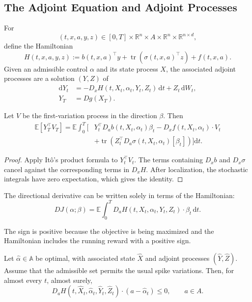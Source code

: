 \subsection{The Adjoint Equation and Adjoint Processes}

\begin{de}
For
\[
(t,x,a,y,z)
\in[0,T]\times\mathbb R^n\times A
\times\mathbb R^n\times\mathbb R^{n\times d},
\]
define the Hamiltonian
\[
H(t,x,a,y,z)
:=b(t,x,a)^\top y
+\operatorname{tr}\!\left(\sigma(t,x,a)^\top z\right)
+f(t,x,a).
\]
Given an admissible control \(\alpha\) and its state process \(X\), the associated adjoint processes are a solution \((Y,Z)\) of
\[
\begin{aligned}
\mathrm dY_t
&=-D_xH(t,X_t,\alpha_t,Y_t,Z_t)\,\mathrm dt
+Z_t\,\mathrm dW_t,\\
Y_T&=Dg(X_T).
\end{aligned}
\]
\end{de}

\begin{lem}
Let \(V\) be the first-variation process in the direction \(\beta\). Then
\[
\begin{aligned}
\mathbb E[Y_T^\top V_T]
=\mathbb E\int_0^T\biggl[
&Y_t^\top D_ab(t,X_t,\alpha_t)\beta_t
-D_xf(t,X_t,\alpha_t)\cdot V_t\\
&+\operatorname{tr}\!\left(
Z_t^\top D_a\sigma(t,X_t,\alpha_t)[\beta_t]
\right)
\biggr]\mathrm dt.
\end{aligned}
\]
\end{lem}

\begin{proof}
Apply It\^o's product formula to \(Y_t^\top V_t\). The terms containing \(D_xb\) and \(D_x\sigma\) cancel against the corresponding terms in \(D_xH\). After localization, the stochastic integrals have zero expectation, which gives the identity.
\end{proof}

\begin{cor}
The directional derivative can be written solely in terms of the Hamiltonian:
\[
D J(\alpha;\beta)
=\mathbb E\int_0^T
D_aH(t,X_t,\alpha_t,Y_t,Z_t)
\cdot\beta_t\,\mathrm dt.
\]
\end{cor}

The sign is positive because the objective is being maximized and the Hamiltonian includes the running reward with a positive sign.

\begin{thm}
Let \(\hat\alpha\in\mathbb A\) be optimal, with associated state \(\hat X\) and adjoint processes \((\hat Y,\hat Z)\). Assume that the admissible set permits the usual spike variations. Then, for almost every \(t\), almost surely,
\[
D_aH(t,\hat X_t,\hat\alpha_t,\hat Y_t,\hat Z_t)
\cdot(a-\hat\alpha_t)
\le0,
\qquad a\in A.
\]
\end{thm}

